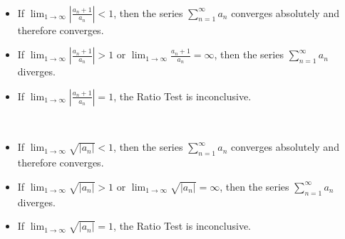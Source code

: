 \begin{theorem} \ \\
  \begin{itemize}
    \item If ${\lim\limits}_{1 \to \infty} \left|\frac{a_n + 1}{a_n}\right| < 1$, then the series ${\sum\limits}_{n=1}^\infty a_n$ converges absolutely and therefore converges.
    \item If ${\lim\limits}_{1 \to \infty} \left|\frac{a_n + 1}{a_n}\right| > 1$ or ${\lim\limits}_{1 \to \infty} \frac{a_n + 1}{a_n} = \infty$, then the series ${\sum\limits}_{n=1}^\infty a_n$ diverges.
    \item If ${\lim\limits}_{1 \to \infty} \left|\frac{a_n + 1}{a_n}\right| = 1$, the Ratio Test is inconclusive.
  \end{itemize}
\end{theorem}

\begin{theorem} \ \\
  \begin{itemize}
    \item If ${\lim\limits}_{1 \to \infty} \sqrt{\left|a_n\right|} < 1$, then the series ${\sum\limits}_{n=1}^\infty a_n$ converges absolutely and therefore converges.
    \item If ${\lim\limits}_{1 \to \infty} \sqrt{\left|a_n\right|} > 1$ or ${\lim\limits}_{1 \to \infty} \sqrt{\left|a_n\right|} = \infty$, then the series ${\sum\limits}_{n=1}^\infty a_n$ diverges.
    \item If ${\lim\limits}_{1 \to \infty} \sqrt{\left|a_n\right|} = 1$, the Ratio Test is inconclusive.
  \end{itemize}
\end{theorem}


